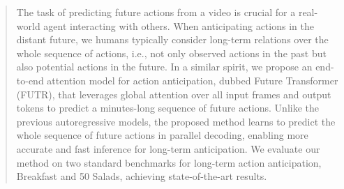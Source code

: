
\begin{abstract}

The task of predicting future actions from a video is crucial for a real-world agent interacting with others. 
When anticipating actions in the distant future, 
we humans typically consider long-term relations over the whole sequence of actions, i.e., not only observed actions in the past but also potential actions in the future. 
In a similar spirit, we propose an end-to-end attention model for action anticipation, dubbed Future Transformer (FUTR), that leverages global attention over all input frames and output tokens to predict a minutes-long sequence of future actions.
Unlike the previous autoregressive models, the proposed method learns to predict the whole sequence of future actions in parallel decoding, enabling more accurate and fast inference for long-term anticipation.
We evaluate our method on two standard benchmarks for long-term action anticipation, Breakfast and 50 Salads, achieving state-of-the-art results.
\end{abstract}